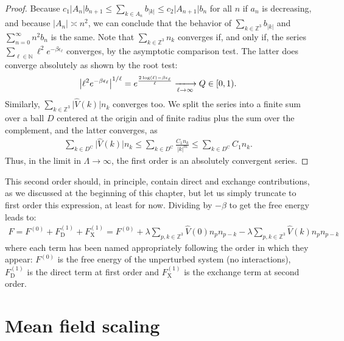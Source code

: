 \begin{proof}
	Because $c_1\vert A_n\vert b_{n+1} \leq \sum_{k\in A_n}b_{\vert k\vert} \leq c_2
	\vert A_{n+1}\vert b_n$ for all $n$ if $a_n$ is decreasing, and because $\vert A_n\vert
	\asymp n^2$, we can conclude that the behavior of $\sum_{k\in\mathbb{Z}^3}
	b_{\vert k\vert}$ and $\sum_{n=0}^\infty n^2 b_n$ is the same. Note that
	$\sum_{k\in\mathbb{Z}^3}n_k$ converges if, and only if, the series $\sum_{\ell\in\mathbb{N}}
	\ell^2 e^{-\beta \epsilon_\ell}$ converges, by the asymptotic comparison test. The latter
	does converge absolutely as shown by the root test:
	\begin{align*}
		\left\vert \ell^2 e^{-\beta\epsilon_{\ell}}\right\vert^{1/\ell}
		= e^{\frac{2\log(\ell) - \beta\epsilon_\ell}{\ell}}
		\xlongrightarrow[\ell\to\infty]{} Q \in [0,1).
	\end{align*}
	Similarly, $\sum_{k\in\mathbb{Z}^3}\vert\hat{V}(k)\vert n_k$ converges too. We split the
	series into a finite sum over a ball $D$ centered at the origin and of finite radius plus
	the sum over the complement, and the latter converges, as
	\begin{align*}
		\sum_{k\in D^\mathrm{C}} \vert\hat{V}(k)\vert n_k
		\leq \sum_{k\in D^\mathrm{C}}\frac{C_1 n_k}{\vert k\vert^m}
		\leq \sum_{k\in D^\mathrm{C}} C_1 n_k.
	\end{align*}
	Thus, in the limit in $\Lambda\to\infty$, the first order is an absolutely convergent series.
\end{proof}

This second order should, in principle, contain direct and exchange contributions, as we
discussed at the beginning of this chapter, but let us simply truncate to first order this
expression, at least for now. Dividing by $-\beta$ to get the free energy leads to:
\begin{align}
	\label{free-energy}
	F = F^{(0)} + F_{\mathrm{D}}^{(1)} + F_{\mathrm{X}}^{(1)}
	= F^{(0)}
	+\lambda\sum_{p,k\in\mathbb{Z}^3} \hat{V}(0) n_p n_{p-k}
	-\lambda\sum_{p,k\in\mathbb{Z}^3} \hat{V}(k) n_p n_{p-k}
\end{align}
where each term has been named appropriately following the order in which they appear: $F^{(0)}$
is the free energy of the unperturbed system (no interactions), $F_{\mathrm{D}}^{(1)}$ is the
direct term at first order and $F_{\mathrm{X}}^{(1)}$ is the exchange term at second order.

\section{Mean field scaling}

